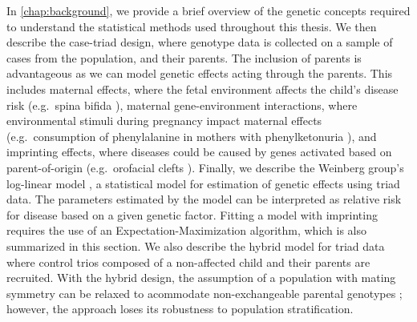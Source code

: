 In \cref{chap:background}, we provide a brief overview of the genetic concepts required to understand the statistical methods used throughout this thesis.
We then describe the case-triad design, where genotype data is collected on a sample of cases from the population, and their parents.
The inclusion of parents is advantageous as we can model genetic effects acting through the parents.
This includes maternal effects, where the fetal environment affects the child's disease risk (e.g.\ spina bifida \cite{Hobbs+14}), maternal gene-environment interactions, where environmental stimuli during pregnancy impact maternal effects (e.g.\ consumption of phenylalanine in mothers with phenylketonuria \cite{Lee+05}), and imprinting effects, where diseases could be caused by genes activated based on parent-of-origin (e.g.\ orofacial clefts \cite{Garl+20}).
Finally, we describe the Weinberg group's log-linear model \cite{Wein+98,Wein99,UmbaWein00,WeinUmba05}, a statistical model for estimation of genetic effects using triad data.
The parameters estimated by the model can be interpreted as relative risk for disease based on a given genetic factor.
Fitting a model with imprinting requires the use of an Expectation-Maximization algorithm, which is also summarized in this section.
We also describe the hybrid model for triad data where control trios composed of a non-affected child and their parents are recruited.
With the hybrid design, the assumption of a population with mating symmetry can be relaxed to acommodate non-exchangeable parental genotypes \cite{WeinUmba05}; however, the approach loses its robustness to population stratification.

